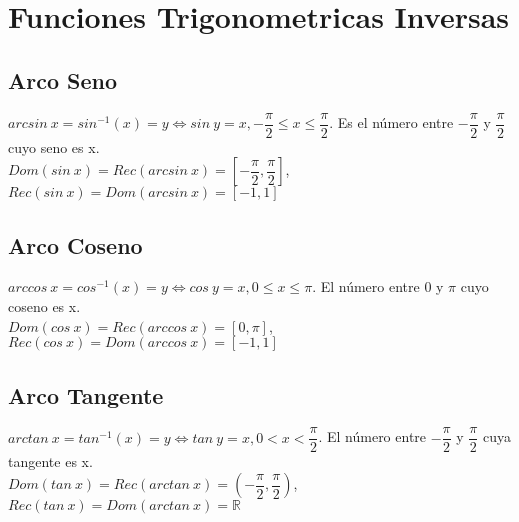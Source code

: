 \documentclass[11pt,a4paper]{article}
\begin{document}
\section{Funciones Trigonometricas Inversas}
\subsection{Arco Seno}
\noindent $arcsin\ x = sin^{-1}(x) = y \iff sin\ y = x, -\dfrac{\pi}{2} \leq x \leq \dfrac{\pi}{2}$. Es el n\'umero entre $-\dfrac{\pi}{2}$ y $\dfrac{\pi}{2}$ cuyo seno es x.\\

\noindent $Dom(sin\ x) = Rec(arcsin\ x) = [-\dfrac{\pi}{2}, \dfrac{\pi}{2}]$, $Rec(sin\ x) = Dom(arcsin\ x) = [-1,1]$

\subsection{Arco Coseno}
\noindent $arccos\ x = cos^{-1}(x) = y \iff cos\ y = x, 0 \leq x \leq \pi$. El n\'umero entre $0$ y $\pi$ cuyo coseno es x.\\

\noindent $Dom(cos\ x) = Rec(arccos\ x) = [0,\pi]$, $Rec(cos\ x) = Dom(arccos\ x) = [-1,1]$

\subsection{Arco Tangente}
\noindent $arctan\ x = tan^{-1}(x) = y \iff tan\ y = x, 0 < x < \dfrac{\pi}{2}$. El n\'umero entre $-\dfrac{\pi}{2}$ y $\dfrac{\pi}{2}$ cuya tangente es x.\\

\noindent $Dom(tan\ x) = Rec(arctan\ x) = (-\dfrac{\pi}{2}, \dfrac{\pi}{2})$, $Rec(tan\ x) = Dom(arctan\ x) = \mathbb{R}$
\end{document}
